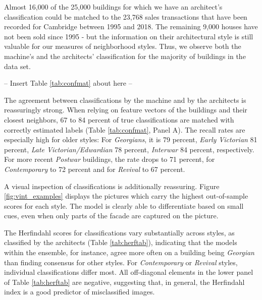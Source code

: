 \documentclass[]{article}
\begin{document}
Almost 16,000 of the 25,000 buildings for which we have an architect's
classification could be matched to the 23,768 sales transactions that
have been recorded for Cambridge between 1995 and 2018. The remaining
9,000 houses have not been sold since 1995 - but the information on
their architectural style is still valuable for our measures of
neighborhood styles. Thus, we observe both the machine's and the
architects' classification for the majority of buildings in the data
set.

\begin{center}
  -- Insert Table \ref{tab:confmat} about here --
\end{center}

The agreement between classifications by the machine and by the
architects is reassuringly strong. When relying on feature vectors of
the buildings and their closest neighbors, 67 to 84 percent of true
classifications are matched with correctly estimated labels (Table
\ref{tab:confmat}, Panel A). The recall rates are especially high for
older styles: For \emph{Georgians}, it is 79 percent, \emph{Early
Victorian} 81 percent, \emph{Late Victorian/Edwardian} 78 percent,
\emph{Interwar} 84 percent, respectively. For more recent \emph{Postwar}
buildings, the rate drops to 71 percent, for \emph{Contemporary} to 72
percent and for \emph{Revival} to 67 percent.

A visual inspection of classifications is additionally reassuring.
Figure \ref{fig:vint_examples} displays the pictures which carry the
highest out-of-sample scores for each style. The model is clearly able
to differentiate based on small cues, even when only parts of the facade
are captured on the picture.

The Herfindahl scores for classifications vary substantially across
styles, as classified by the architects (Table \ref{tab:herftab}),
indicating that the models within the ensemble, for instance, agree more
often on a building being \emph{Georgian} than finding consensus for
other styles. For \emph{Contemporary} or \emph{Revival} styles,
individual classifications differ most. All off-diagonal elements in the
lower panel of Table \ref{tab:herftab} are negative, suggesting that, in
general, the Herfindahl index is a good predictor of misclassified
images.
\end{document}
